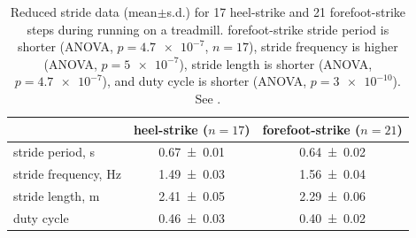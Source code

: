 \begin{table}[h]
\caption{Reduced stride data (mean$\pm$s.d.) for 17 heel-strike and 21 forefoot-strike steps during running on a treadmill. forefoot-strike stride period is shorter (ANOVA, $p=\num{4.7e-7}$, $n=17$), stride frequency is higher (ANOVA, $p=\num{5e-7}$), stride length is shorter (ANOVA, $p=\num{4.7e-7}$), and duty cycle is shorter (ANOVA, $p=\num{3e-10}$). See .}
\label{tab:results:stride}
\begin{center}
\begin{tabular}{lcc}
\toprule
& heel-strike ($n=17$) & forefoot-strike ($n=21$)\\
\midrule 
stride period, \si{\second}   & \num{0.67\pm0.01} & \num{0.64\pm0.02} \\
stride frequency, \si{\hertz} & \num{1.49\pm0.03} & \num{1.56\pm0.04} \\
stride length, \si{\meter}    & \num{2.41\pm0.05} & \num{2.29\pm0.06} \\
duty cycle                    & \num{0.46\pm0.03} & \num{0.40\pm0.02} \\
\bottomrule
\end{tabular}
\end{center}
\end{table}

